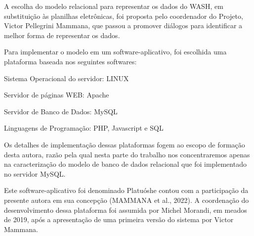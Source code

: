\documentclass[
12pt,		%
openright,	%
twoside,  %
a4paper,			%
chapter=TITLE,		%
english,			%
french,				%
spanish,			%
brazil				%
]{USPSC-classe/USPSC}
\begin{document}
A escolha do modelo relacional para representar os dados do WASH, em substitui\c{c}\~ao \`as planilhas eletr\^onicas, foi proposta pelo coordenador do Projeto, Victor Pellegrini Mammana, que passou a promover di\'alogos para identificar a melhor forma de representar os dados.

















Para implementar o modelo em um software-aplicativo, foi escolhida uma plataforma baseada nos seguintes softwares:


















\begin{alineas}
\item Sistema Operacional do servidor: LINUX
\item Servidor de p\'aginas WEB: Apache
\item Servidor de Banco de Dados: MySQL
\item Linguagens de Programa\c{c}\~ao: PHP, Javascript e SQL
\end{alineas}

Os detalhes de implementa\c{c}\~ao dessas plataformas fogem ao escopo de forma\c{c}\~ao desta autora, raz\~ao pela qual nesta parte do trabalho nos concentraremos apenas na caracteriza\c{c}\~ao do modelo de banco de dados relacional que foi implementado no servidor MySQL.

















Este software-aplicativo foi denominado \textquotedbl Platu\'osh\textquotedbl  e contou com a participa\c{c}\~ao da presente autora em sua concep\c{c}\~ao  (MAMMANA et al., 2022). A coordena\c{c}\~ao do desenvolvimento dessa plataforma foi assumida por Michel Morandi, em meados de 2019, ap\'os a apresenta\c{c}\~ao de uma primeira vers\~ao do sistema por Victor Mammana.
\end{document}
